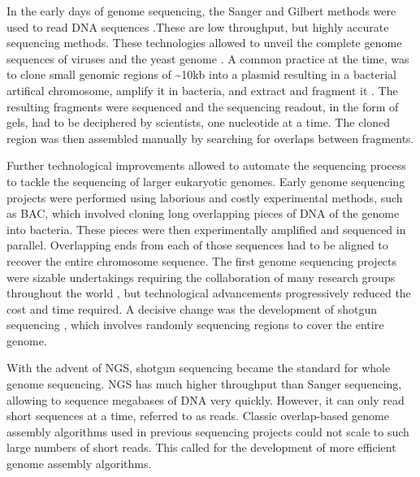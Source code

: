 In the early days of genome sequencing, the Sanger and Gilbert methods were used to read DNA sequences \cite{sangerDNASequencingChainterminating1977,maxamNewMethodSequencing1977}.These are low throughput, but highly accurate sequencing methods. These technologies allowed to unveil the complete genome sequences of viruses \citep{sangerNucleotideSequenceBacteriophage1982,baerDNASequenceExpression1984,vanwezenbeekNucleotideSequenceFilamentous1980} and the yeast genome \cite{oliverCompleteDNASequence1992}. A common practice at the time, was to clone small genomic regions of \textasciitilde 10kb into a plasmid resulting in a bacterial artifical chromosome, amplify it in bacteria, and extract and fragment it \cite{thierryCompleteSequenceKb1990}. The resulting fragments were sequenced and the sequencing readout, in the form of gels, had to be deciphered by scientists, one nucleotide at a time. The cloned region was then assembled manually by searching for overlaps between fragments.

Further technological improvements allowed to automate the sequencing process to tackle the sequencing of larger eukaryotic genomes. Early genome sequencing projects were performed using laborious and costly experimental methods, such as \acrfull{BAC}, which involved cloning long overlapping pieces of DNA of the genome into bacteria. These pieces were then experimentally amplified and sequenced in parallel. Overlapping ends from each of those sequences had to be aligned to recover the entire chromosome sequence. The first genome sequencing projects were sizable undertakings requiring the collaboration of many research groups throughout the world \citep{collinsNewFiveyearPlan1993,adamsGenomeSequenceDrosophila2000,oliverCompleteDNASequence1992}, but technological advancements progressively reduced the cost and time required. A decisive change was the development of shotgun sequencing \cite{venterSequenceHumanGenome2001}, which involves randomly sequencing regions to cover the entire genome.

With the advent of \acrfull{NGS}, shotgun sequencing became the standard for whole genome sequencing. \acrshort{NGS} has much higher throughput than Sanger sequencing, allowing to sequence megabases of DNA very quickly. However, it can only read short sequences at a time, referred to as \Gls{read}s. Classic overlap-based genome assembly algorithms used in previous sequencing projects could not scale to such large numbers of short reads. This called for the development of more efficient genome assembly algorithms.

